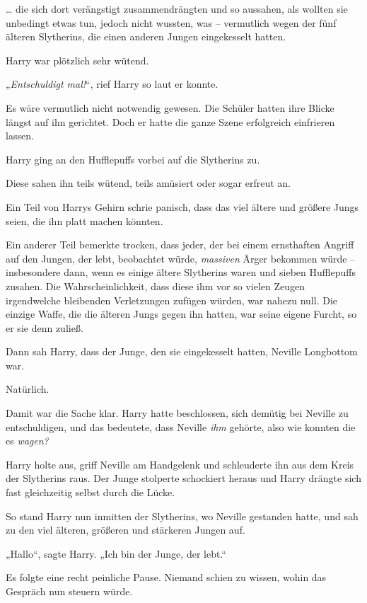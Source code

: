 {… die sich dort verängstigt zusammendrängten und so aussahen, als wollten sie unbedingt etwas tun, jedoch nicht wussten, was -- vermutlich wegen der fünf älteren Slytherins, die einen anderen Jungen eingekesselt hatten.

Harry war plötzlich sehr wütend.

„\emph{Entschuldigt mal!}“, rief Harry so laut er konnte.

Es wäre vermutlich nicht notwendig gewesen. Die Schüler hatten ihre Blicke längst auf ihn gerichtet. Doch er hatte die ganze Szene erfolgreich einfrieren lassen.

Harry ging an den Hufflepuffs vorbei auf die Slytherins zu.

Diese sahen ihn teils wütend, teils amüsiert oder sogar erfreut an.

Ein Teil von Harrys Gehirn schrie panisch, dass das viel ältere und größere Jungs seien, die ihn platt machen könnten.

Ein anderer Teil bemerkte trocken, dass jeder, der bei einem ernsthaften Angriff auf den Jungen, der lebt, beobachtet würde, \emph{massiven} Ärger bekommen würde -- insbesondere dann, wenn es einige ältere Slytherins waren und sieben Hufflepuffs zusahen. Die Wahrscheinlichkeit, dass diese ihm vor so vielen Zeugen irgendwelche bleibenden Verletzungen zufügen würden, war nahezu null. Die einzige Waffe, die die älteren Jungs gegen ihn hatten, war seine eigene Furcht, so er sie denn zuließ.

Dann sah Harry, dass der Junge, den sie eingekesselt hatten, Neville Longbottom war.

Natürlich.

Damit war die Sache klar. Harry hatte beschlossen, sich demütig bei Neville zu entschuldigen, und das bedeutete, dass Neville \emph{ihm} gehörte, also wie konnten die es \emph{wagen?}

Harry holte aus, griff Neville am Handgelenk und schleuderte ihn aus dem Kreis der Slytherins raus. Der Junge stolperte schockiert heraus und Harry drängte sich fast gleichzeitig selbst durch die Lücke.

So stand Harry nun inmitten der Slytherins, wo Neville gestanden hatte, und sah zu den viel älteren, größeren und stärkeren Jungen auf.

„Hallo“, sagte Harry. „Ich bin der Junge, der lebt.“

Es folgte eine recht peinliche Pause. Niemand schien zu wissen, wohin das Gespräch nun steuern würde.

}
